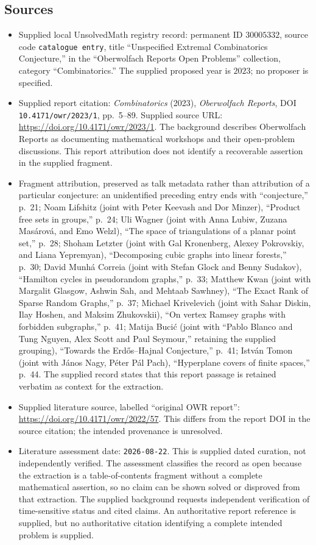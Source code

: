 \documentclass[11pt]{article}
\begin{document}
\subsection{Sources}
\begin{itemize}
\item Supplied local UnsolvedMath registry record: permanent ID \(30005332\), source code \texttt{catalogue entry}, title ``Unspecified Extremal Combinatorics Conjecture,'' in the ``Oberwolfach Reports Open Problems'' collection, category ``Combinatorics.'' The supplied proposed year is \(2023\); no proposer is specified.
\item Supplied report citation: \emph{Combinatorics} (2023), \emph{Oberwolfach Reports}, DOI \texttt{10.4171/owr/2023/1}, pp.~5--89. Supplied source URL: \url{https://doi.org/10.4171/owr/2023/1}. The background describes Oberwolfach Reports as documenting mathematical workshops and their open-problem discussions. This report attribution does not identify a recoverable assertion in the supplied fragment.
\item Fragment attribution, preserved as talk metadata rather than attribution of a particular conjecture: an unidentified preceding entry ends with ``conjecture,'' p.~21; Noam Lifshitz (joint with Peter Keevash and Dor Minzer), ``Product free sets in groups,'' p.~24; Uli Wagner (joint with Anna Lubiw, Zuzana Masárová, and Emo Welzl), ``The space of triangulations of a planar point set,'' p.~28; Shoham Letzter (joint with Gal Kronenberg, Alexey Pokrovskiy, and Liana Yepremyan), ``Decomposing cubic graphs into linear forests,'' p.~30; David Munhá Correia (joint with Stefan Glock and Benny Sudakov), ``Hamilton cycles in pseudorandom graphs,'' p.~33; Matthew Kwan (joint with Margalit Glasgow, Ashwin Sah, and Mehtaab Sawhney), ``The Exact Rank of Sparse Random Graphs,'' p.~37; Michael Krivelevich (joint with Sahar Diskin, Ilay Hoshen, and Maksim Zhukovskii), ``On vertex Ramsey graphs with forbidden subgraphs,'' p.~41; Matija Bucić (joint with ``Pablo Blanco and Tung Nguyen, Alex Scott and Paul Seymour,'' retaining the supplied grouping), ``Towards the Erdős--Hajnal Conjecture,'' p.~41; István Tomon (joint with János Nagy, Péter Pál Pach), ``Hyperplane covers of finite spaces,'' p.~44. The supplied record states that this report passage is retained verbatim as context for the extraction.
\item Supplied literature source, labelled ``original OWR report'': \url{https://doi.org/10.4171/owr/2022/57}. This differs from the report DOI in the source citation; the intended provenance is unresolved.
\item Literature assessment date: \texttt{2026-08-22}. This is supplied dated curation, not independently verified. The assessment classifies the record as open because the extraction is a table-of-contents fragment without a complete mathematical assertion, so no claim can be shown solved or disproved from that extraction. The supplied background requests independent verification of time-sensitive status and cited claims. An authoritative report reference is supplied, but no authoritative citation identifying a complete intended problem is supplied.
\end{itemize}
\end{document}
